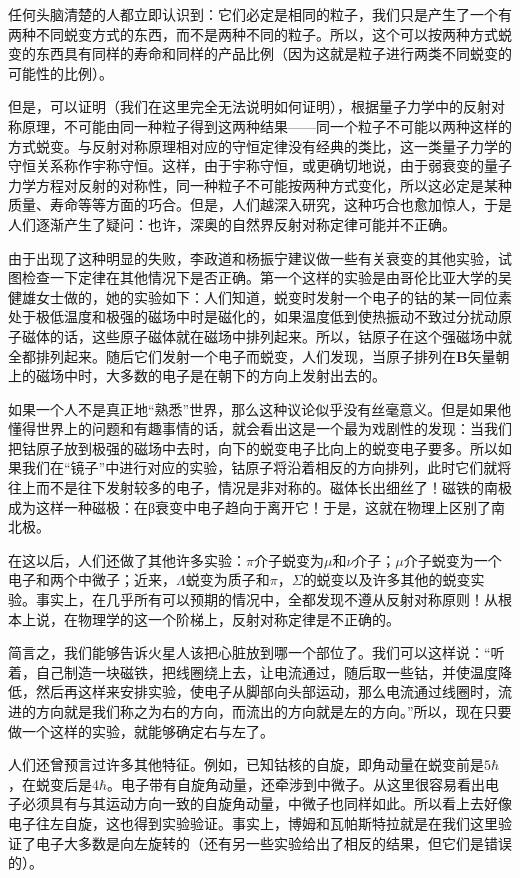 任何头脑清楚的人都立即认识到：它们必定是相同的粒子，我们只是产生了一个有两种不同蜕变方式的东西，而不是两种不同的粒子。所以，这个可以按两种方式蜕变的东西具有同样的寿命和同样的产品比例（因为这就是粒子进行两类不同蜕变的可能性的比例）。

但是，可以证明（我们在这里完全无法说明如何证明），根据量子力学中的反射对称原理，不可能由同一种粒子得到这两种结果——同一个粒子不可能以两种这样的方式蜕变。与反射对称原理相对应的守恒定律没有经典的类比，这一类量子力学的守恒关系称作宇称守恒。这样，由于宇称守恒，或更确切地说，由于弱衰变的量子力学方程对反射的对称性，同一种粒子不可能按两种方式变化，所以这必定是某种质量、寿命等等方面的巧合。但是，人们越深入研究，这种巧合也愈加惊人，于是人们逐渐产生了疑问：也许，深奥的自然界反射对称定律可能并不正确。

由于出现了这种明显的失败，李政道和杨振宁建议做一些有关衰变的其他实验，试图检查一下定律在其他情况下是否正确。第一个这样的实验是由哥伦比亚大学的吴健雄女士做的，她的实验如下：人们知道，蜕变时发射一个电子的钴的某一同位素处于极低温度和极强的磁场中时是磁化的，如果温度低到使热振动不致过分扰动原子磁体的话，这些原子磁体就在磁场中排列起来。所以，钴原子在这个强磁场中就全都排列起来。随后它们发射一个电子而蜕变，人们发现，当原子排列在$\boldsymbol{B}$矢量朝上的磁场中时，大多数的电子是在朝下的方向上发射出去的。

如果一个人不是真正地“熟悉”世界，那么这种议论似乎没有丝毫意义。但是如果他懂得世界上的问题和有趣事情的话，就会看出这是一个最为戏剧性的发现：当我们把钴原子放到极强的磁场中去时，向下的蜕变电子比向上的蜕变电子要多。所以如果我们在“镜子”中进行对应的实验，钴原子将沿着相反的方向排列，此时它们就将往上而不是往下发射较多的电子，情况是非对称的。磁体长出细丝了！磁铁的南极成为这样一种磁极：在β衰变中电子趋向于离开它！于是，这就在物理上区别了南北极。

在这以后，人们还做了其他许多实验：$\pi$介子蜕变为$\mu$和$\nu$介子；$\mu$介子蜕变为一个电子和两个中微子；近来，$\Lambda$蜕变为质子和$\pi$，$\Sigma$的蜕变以及许多其他的蜕变实验。事实上，在几乎所有可以预期的情况中，全都发现不遵从反射对称原则！从根本上说，在物理学的这一个阶梯上，反射对称定律是不正确的。

简言之，我们能够告诉火星人该把心脏放到哪一个部位了。我们可以这样说：“听着，自己制造一块磁铁，把线圈绕上去，让电流通过，随后取一些钴，并使温度降低，然后再这样来安排实验，使电子从脚部向头部运动，那么电流通过线圈时，流进的方向就是我们称之为右的方向，而流出的方向就是左的方向。”所以，现在只要做一个这样的实验，就能够确定右与左了。

人们还曾预言过许多其他特征。例如，已知钴核的自旋，即角动量在蜕变前是$5\hbar$，在蜕变后是$4\hbar$。电子带有自旋角动量，还牵涉到中微子。从这里很容易看出电子必须具有与其运动方向一致的自旋角动量，中微子也同样如此。所以看上去好像电子往左自旋，这也得到实验验证。事实上，博姆和瓦帕斯特拉就是在我们这里验证了电子大多数是向左旋转的（还有另一些实验给出了相反的结果，但它们是错误的）。

